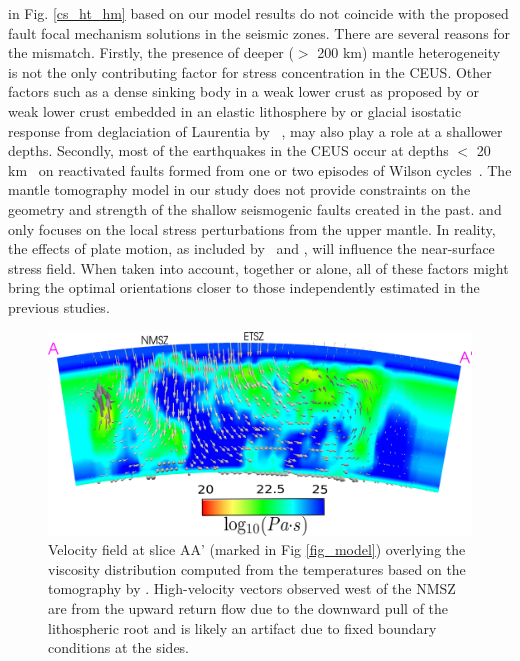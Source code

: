 \documentclass[draft,linenumbers]{agujournal2018}
\begin{document}
      in Fig. \ref{cs_ht_hm} based on our model results do not coincide with the proposed fault focal mechanism solutions in the seismic zones. There are several reasons for the mismatch. Firstly, the presence of deeper ($>$ 200 km) mantle heterogeneity is not the only contributing factor for stress concentration in the CEUS. Other factors such as a dense sinking body in a weak lower crust as proposed by \citet{Pollitz_2001} or weak lower crust embedded in an elastic lithosphere by \citet{Kenner_2000a} or glacial isostatic response from deglaciation of Laurentia by ~\citet{Grollimund_2001}, may also play a role at a shallower depths.  Secondly, most of the earthquakes in the CEUS occur at depths $<$ 20 km~\citep[e.g.,][]{bollinger1985seismicity, chiu1992imaging, powell2016grenville} on reactivated faults formed from one or two episodes of Wilson cycles~\citep{thomas2006tectonic, wolin2012mineral}. The mantle tomography model in our study does not provide constraints on the geometry and strength of the shallow seismogenic faults created in the past.  and only focuses on the local stress perturbations from the upper mantle. In reality, the effects of plate motion, as included by~\citet{zhan2016stress} and \citet{levandowski2016dense}, will influence the near-surface stress field. When taken into account, together or alone, all of these factors might bring the optimal orientations closer to those independently estimated in the previous studies. 
%    
\begin{figure}[ht]
    \centering
    \includegraphics[width=0.9\linewidth]{figures/velocity_pattern.png}
    \caption{Velocity field at slice AA' (marked in Fig \ref{fig_model}) overlying the viscosity distribution computed from the temperatures based on the tomography by \citet{Biryol_2016}. High-velocity vectors observed west of the NMSZ are from the upward return flow due to the downward pull of the lithospheric root and is likely an artifact due to fixed boundary conditions at the sides.}
    \label{velocity_pattern}
\end{figure}
\end{document}
